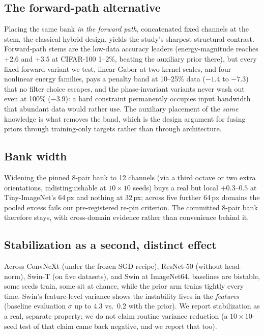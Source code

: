 \subsection{The forward-path alternative}\label{abl:forward}
Placing the same bank \emph{in the forward path}, concatenated fixed
channels at the stem, the classical hybrid design, yields the study's
sharpest structural contrast. Forward-path stems are the low-data
accuracy leaders (energy-magnitude reaches $+2.6$ and $+3.5$ at CIFAR-100
1--2\%, beating the auxiliary prior there), but every fixed forward
variant we test, linear Gabor at two kernel scales, and four nonlinear
energy families, pays a penalty band at 10--25\% data ($-1.4$ to
$-7.3$) that no filter choice escapes, and the phase-invariant variants
never wash out even at 100\% ($-3.9$): a hard constraint permanently
occupies input bandwidth that abundant data would rather use. The
auxiliary placement of the \emph{same} knowledge is what removes the
band, which is the design argument for fusing priors through
training-only targets rather than through architecture.

\subsection{Bank width}\label{abl:width}
Widening the pinned 8-pair bank to 12 channels (via a third octave or two
extra orientations, indistinguishable at $10{\times}10$ seeds) buys a
real but local $+0.3$--$0.5$ at Tiny-ImageNet's 64\,px and nothing at
32\,px; across five further 64\,px domains the pooled excess fails our
pre-registered re-pin criterion. The committed 8-pair bank therefore
stays, with cross-domain evidence rather than convenience behind it.

\subsection{Stabilization as a second, distinct effect}\label{abl:stab}
Across ConvNeXt (under the frozen SGD recipe), ResNet-50 (without
head-norm), Swin-T (on five datasets), and Swin at ImageNet64, baselines
are bistable, some seeds train, some sit at chance, while the prior
arm trains tightly every time. Swin's feature-level variance shows the
instability lives in the \emph{features} (baseline evaluation $\sigma$ up to
$4.3$ vs.\ $0.2$ with the prior). We report stabilization as a real,
separate property; we do not claim routine variance reduction (a
$10{\times}10$-seed test of that claim came back negative, and we report
that too).

